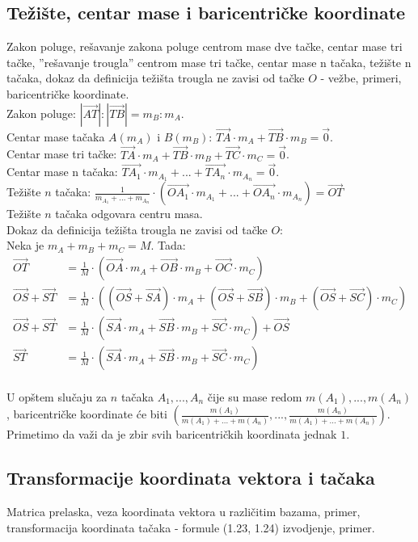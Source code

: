 \documentclass[12pt]{article}
\newcommand{\vek}[1]{\overrightarrow{#1}}
\begin{document}
    \subsection{Težište, centar mase i baricentričke koordinate}
    Zakon poluge, rešavanje zakona poluge centrom mase dve tačke, centar
    mase tri tačke, ”rešavanje trougla” centrom mase tri tačke, centar
    mase n tačaka, težište n tačaka, dokaz da definicija težišta trougla
    ne zavisi od tačke $O$ - vežbe, primeri, baricentričke koordinate.
    \\[1cm]
    Zakon poluge: $|\vek{AT}|:|\vek{TB}|=m_B:m_A$.\\
    Centar mase tačaka $A(m_A)$ i $B(m_B)$: $\vek{TA}\cdot m_A+\vek{TB}\cdot m_B=\vek{0}$.\\
    Centar mase tri tačke: $\vek{TA}\cdot m_A+\vek{TB}\cdot m_B+\vek{TC}\cdot m_C=\vek{0}$.\\
    Centar mase n tačaka: $\vek{TA_1}\cdot m_{A_1}+...+\vek{TA_n}\cdot m_{A_n}=\vek{0}$.\\
    Težište $n$ tačaka: $\frac{1}{m_{A_1}+...+m_{A_n}}\cdot(\vek{OA_1}\cdot m_{A_1}+...+\vek{OA_n}\cdot m_{A_n})=\vek{OT}$\\
    Težište $n$ tačaka odgovara centru masa.\\
    Dokaz da definicija težišta trougla ne zavisi od tačke $O$:\\
    Neka je $m_{A}+m_{B}+m_{C}=M$. Tada:
    \begin{align*}
        \vek{OT}          & =\frac{1}{M}\cdot(\vek{OA}\cdot m_{A}+\vek{OB}\cdot m_{B}+\vek{OC}\cdot m_{C})                                  \\
        \vek{OS}+\vek{ST} & =\frac{1}{M}\cdot((\vek{OS}+\vek{SA})\cdot m_{A}+(\vek{OS}+\vek{SB})\cdot m_{B}+(\vek{OS}+\vek{SC})\cdot m_{C}) \\
        \vek{OS}+\vek{ST} & =\frac{1}{M}\cdot(\vek{SA}\cdot m_{A}+\vek{SB}\cdot m_{B}+\vek{SC}\cdot m_{C})+\vek{OS}                         \\
        \vek{ST}          & =\frac{1}{M}\cdot(\vek{SA}\cdot m_{A}+\vek{SB}\cdot m_{B}+\vek{SC}\cdot m_{C})
    \end{align*}\\
    U opštem slučaju za $n$ tačaka $A_1,...,A_n$ čije su mase redom $m(A_1),...,m(A_n)$, baricentričke koordinate će biti
$(\frac{m(A_1)}{m(A_1)+...+m(A_n)},...,\frac{m(A_n)}{m(A_1)+...+m(A_n)})$. Primetimo da važi da je zbir svih baricentričkih
    koordinata jednak $1$.

    \subsection{Transformacije koordinata vektora i tačaka}
    Matrica prelaska, veza koordinata vektora u različitim bazama,
    primer, transformacija koordinata tačaka - formule (1.23, 1.24)
    izvodjenje, primer.\par
\end{document}
